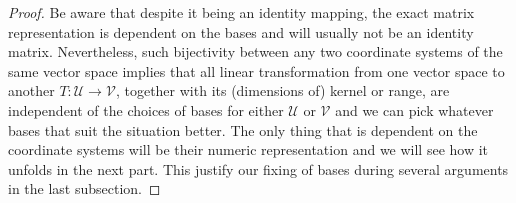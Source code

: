 \begin{proof}
Be aware that despite it being an identity mapping, the exact matrix representation is dependent on the bases and will usually not be an identity matrix. Nevertheless, such bijectivity between any two coordinate systems of the same vector space implies that all linear transformation from one vector space to another $T: \mathcal{U} \to \mathcal{V}$, together with its (dimensions of) kernel or range, are independent of the choices of bases for either $\mathcal{U}$ or $\mathcal{V}$ and we can pick whatever bases that suit the situation better. The only thing that is dependent on the coordinate systems will be their numeric representation and we will see how it unfolds in the next part. This justify our fixing of bases during several arguments in the last subsection.
\end{proof}

